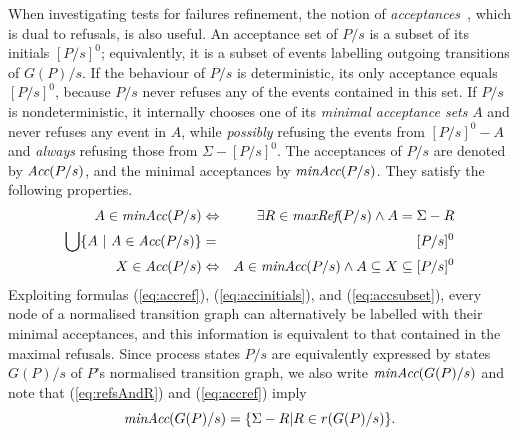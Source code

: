 When investigating  tests for failures refinement, the notion of
\emph{acceptances}~\cite{Hennessy:1988:ATP:50497}, which is dual to refusals,
is also useful. An acceptance set of $P/s$ is a subset of its initials
$[P/s]^0$; equivalently, it is a subset of events labelling  outgoing transitions of
$G(P)/s$. If the behaviour of  $P/s$ is deterministic, its only acceptance
equals $[P/s]^0$, because $P/s$ never refuses any of the events contained in
this set. If $P/s$ is nondeterministic, it internally chooses one of its
\emph{minimal acceptance sets} $A$ and never refuses any event in $A$, while
{\it possibly} refusing the events from $[P/s]^0 - A$ and
{\it always} refusing those from $\Sigma - [P/s]^0$.
The acceptances of $P/s$ are denoted by
$\text{\it Acc}(P/s)$, and the minimal acceptances by $\text{\it minAcc}(P/s)$. They satisfy
the following properties.
%
\begin{eqnarray}
A\in \text{\it minAcc}(P/s) & \Leftrightarrow & \exists R\in\text{\it maxRef}(P/s) \wedge A = \Sigma-R
\label{eq:accref}
\\
\bigcup \{ A~|~A\in \text{\it Acc}(P/s)\} & = & [P/s]^0
\label{eq:accinitials}
\\
 X\in\text{\it Acc}(P/s) &\Leftrightarrow & A\in \text{\it minAcc}(P/s) \wedge A\subseteq X \subseteq [P/s]^0
 \label{eq:accsubset}
\end{eqnarray}
%
%
Exploiting formulas (\ref{eq:accref}), (\ref{eq:accinitials}), and
(\ref{eq:accsubset}), every node of a normalised transition graph can
alternatively be labelled with their minimal acceptances, and this
information is equivalent to that contained in the maximal refusals. Since
process states $P/s$ are equivalently expressed by states $G(P)/s$ of $P$'s
normalised transition graph, we also write $\text{\it minAcc}(G(P)/s)$ and
note that (\ref{eq:refsAndR}) and (\ref{eq:accref}) imply
\begin{equation}\label{eq:maxrefsminaccs}
\text{\it minAcc}(G(P)/s) = \{ \Sigma - R | R\in r(G(P)/s) \}.
\end{equation}

